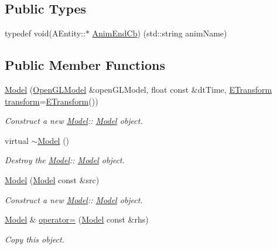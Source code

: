 \subsection*{Public Types}
\begin{DoxyCompactItemize}
\item 
typedef void(A\+Entity\+::$\ast$ \hyperlink{class_model_a10bbf272d503c30923993e5a5ac45bed}{Anim\+End\+Cb}) (std\+::string anim\+Name)
\end{DoxyCompactItemize}
\subsection*{Public Member Functions}
\begin{DoxyCompactItemize}
\item 
\hyperlink{class_model_abd566d0030ea6d854f110498b0c774a2}{Model} (\hyperlink{class_open_g_l_model}{Open\+G\+L\+Model} \&open\+G\+L\+Model, float const \&dt\+Time, \hyperlink{class_e_transform}{E\+Transform} \hyperlink{class_model_a7b63d1be0afb6c145d1b97ac58a23a3a}{transform}=\hyperlink{class_e_transform}{E\+Transform}())
\begin{DoxyCompactList}\small\item\em Construct a new \hyperlink{class_model}{Model}\+:\+: \hyperlink{class_model}{Model} object. \end{DoxyCompactList}\item 
\mbox{\label{class_model_ad6ebd2062a0b823db841a0b88baac4c0}} 
virtual \hyperlink{class_model_ad6ebd2062a0b823db841a0b88baac4c0}{$\sim$\+Model} ()
\begin{DoxyCompactList}\small\item\em Destroy the \hyperlink{class_model}{Model}\+:\+: \hyperlink{class_model}{Model} object. \end{DoxyCompactList}\item 
\hyperlink{class_model_a242adc0075374718143a988c215f5bac}{Model} (\hyperlink{class_model}{Model} const \&src)
\begin{DoxyCompactList}\small\item\em Construct a new \hyperlink{class_model}{Model}\+:\+: \hyperlink{class_model}{Model} object. \end{DoxyCompactList}\item 
\hyperlink{class_model}{Model} \& \hyperlink{class_model_a002b25b1a4724e1d67c7f93d2db721e4}{operator=} (\hyperlink{class_model}{Model} const \&rhs)
\begin{DoxyCompactList}\small\item\em Copy this object. \end{DoxyCompactList}\item 

\end{DoxyCompactItemize}
